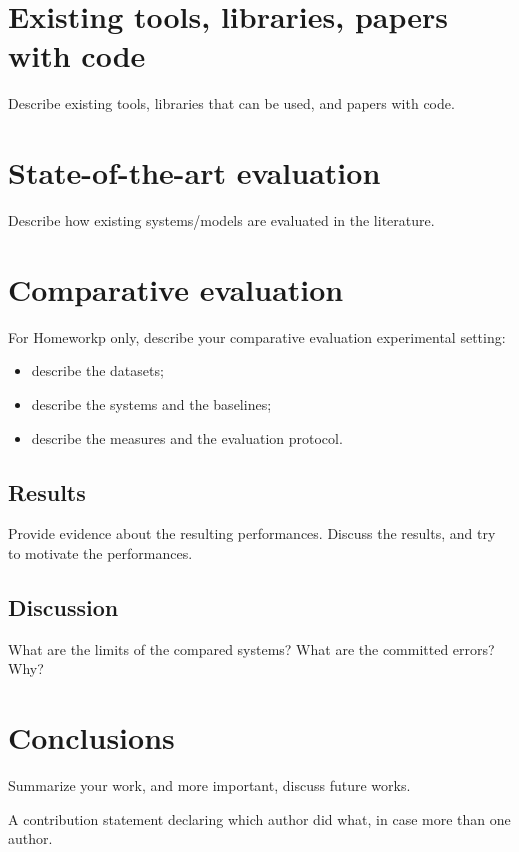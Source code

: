 \documentclass[11pt]{article}
\newcommand{\minisection}[1]{\noindent{\textbf{#1.}}}
\begin{document}
\section{Existing tools, libraries, papers with code}
Describe existing tools, libraries that can be used, and papers with code.

\section{State-of-the-art evaluation}
Describe how existing systems/models are evaluated in the literature.

\section{Comparative evaluation}
For Homeworkp only, describe your comparative evaluation experimental setting:
\begin{itemize}
    \item describe the datasets;
    \item describe the systems and the baselines;
    \item describe the measures and the evaluation protocol.
\end{itemize}

\subsection{Results}
Provide evidence about the resulting performances. Discuss the results, and try to motivate the performances. 

\subsection{Discussion}
What are the limits of the compared systems? What are the committed errors? Why?

\section{Conclusions}
Summarize your work, and more important, discuss future works.

\minisection{Contributions} A contribution statement declaring which author did what, in case more than one author.


\end{document}
